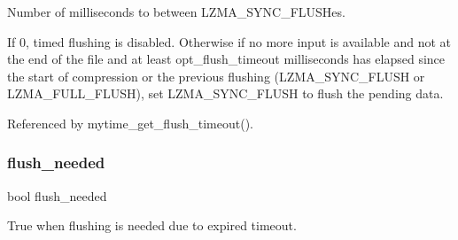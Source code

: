 Number of milliseconds to between L\+Z\+M\+A\+\_\+\+S\+Y\+N\+C\+\_\+\+F\+L\+U\+S\+Hes. 

If 0, timed flushing is disabled. Otherwise if no more input is available and not at the end of the file and at least opt\+\_\+flush\+\_\+timeout milliseconds has elapsed since the start of compression or the previous flushing (L\+Z\+M\+A\+\_\+\+S\+Y\+N\+C\+\_\+\+F\+L\+U\+SH or L\+Z\+M\+A\+\_\+\+F\+U\+L\+L\+\_\+\+F\+L\+U\+SH), set L\+Z\+M\+A\+\_\+\+S\+Y\+N\+C\+\_\+\+F\+L\+U\+SH to flush the pending data. 

Referenced by mytime\+\_\+get\+\_\+flush\+\_\+timeout().

\mbox{\label{mytime_8c_ab6d388eefb45931239a4c197f6f70899}} 
\subsubsection{flush\+\_\+needed}
{\footnotesize\ttfamily bool flush\+\_\+needed}



True when flushing is needed due to expired timeout. 

